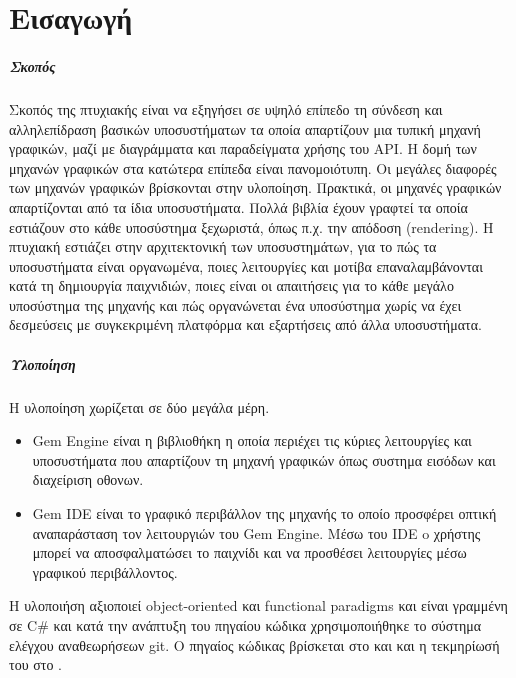 \chapter{Εισαγωγή}
	\paragraph{Σκοπός}
	Σκοπός της πτυχιακής είναι να εξηγήσει σε υψηλό επίπεδο τη σύνδεση και αλληλεπίδραση βασικών υποσυστήματων τα οποία απαρτίζουν μια
	τυπική μηχανή γραφικών, μαζί με διαγράμματα και παραδείγματα χρήσης του \gls{API}. 
	Η δομή των μηχανών γραφικών στα κατώτερα επίπεδα είναι πανομοιότυπη. Οι μεγάλες διαφορές των μηχανών γραφικών βρίσκονται στην υλοποίηση. Πρακτικά, οι μηχανές γραφικών απαρτίζονται από τα ίδια υποσυστήματα. Πολλά βιβλία έχουν γραφτεί τα οποία εστιάζουν στο κάθε υποσύστημα ξεχωριστά, όπως π.χ. την απόδοση (rendering).
	Η πτυχιακή εστιάζει στην αρχιτεκτονική των υποσυστημάτων, για το πώς τα υποσυστήματα είναι οργανωμένα, ποιες λειτουργίες και μοτίβα επαναλαμβάνονται κατά τη δημιουργία παιχνιδιών, ποιες είναι οι απαιτήσεις για το κάθε μεγάλο υποσύστημα της μηχανής και πώς οργανώνεται ένα υποσύστημα χωρίς να έχει δεσμεύσεις με συγκεκριμένη πλατφόρμα και εξαρτήσεις από άλλα υποσυστήματα.

	\paragraph{Υλοποίηση}
	Η υλοποίηση χωρίζεται σε δύο μεγάλα μέρη.	
	\begin{itemize}
		\item {Gem Engine} είναι η βιβλιοθήκη η οποία περιέχει τις κύριες λειτουργίες και υποσυστήματα που απαρτίζουν τη μηχανή γραφικών όπως συστημα εισόδων και διαχείριση οθονων.
		\item {Gem IDE} είναι το γραφικό περιβάλλον της μηχανής το οποίο προσφέρει οπτική αναπαράσταση τον λειτουργιών του Gem Engine. Μέσω του IDE o χρήστης μπορεί να αποσφαλματώσει το παιχνίδι και να προσθέσει λειτουργίες μέσω γραφικού περιβάλλοντος.
	\end{itemize}
	H υλοποιήση αξιοποιεί object-oriented και functional paradigms και είναι γραμμένη σε C\# και κατά την ανάπτυξη του πηγαίου κώδικα χρησιμοποιήθηκε το σύστημα ελέγχου αναθεωρήσεων git.  Ο πηγαίος κώδικας βρίσκεται στο \cite{gem} και \cite{ginet} και η τεκμηρίωσή του στο \cite{gemDocs}.	
	
